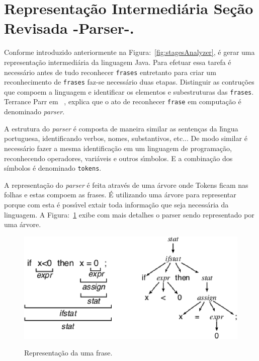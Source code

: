 \section{Representa\c{c}\~{a}o Intermedi\'{a}ria {\color{red}Se\c{c}\~{a}o Revisada -Parser-.}}\label{sec:IR}

Conforme introduzido anteriormente na Figura:~\ref{fig:stagesAnalyzer}, \'{e} gerar uma representa\c{c}\~{a}o intermedi\'{a}ria da linguagem Java. Para efetuar essa tarefa é necessário antes de tudo reconhecer \texttt{frases} entretanto para criar um reconhecimento de \texttt{frases} faz-se necessário duas etapas. Distinguir as contru\c{c}ões que compoem a linguagem e identificar os elementos e subestruturas das \texttt{frases}. Terrance Parr em ~\cite{Parr:2009:LIP:1823613}, explica que o ato de reconhecer \texttt{frase} em computa\c{c}\~{a}o é denominado \textit{parser}.

A estrutura do \textit{parser} \'{e} composta de maneira similar as senten\c{c}as da l\'{\i}ngua portuguesa, identificando verbos, nomes, substantivos, etc... De modo similar \'{e} necess\'{a}rio fazer a mesma identifica\c{c}\~{a}o em um linguagem de programa\c{c}\~{a}o, reconhecendo operadores, vari\'{a}veis e outros s\'{\i}mbolos. E a combina\c{c}\~{a}o dos s\'{i}mbolos \'{e} denominado \texttt{tokens}.

A representa\c{c}\~{a}o do \textit{parser} \'{e} feita atrav\'{e}s de uma árvore onde Tokens ficam nas folhas e estas  compoem as frases. \'{E} utilizando uma \'{a}rvore para representar porque com esta \'{e} poss\'{\i}vel extair toda informa\c{c}\~{a}o que seja necess\'{a}ria da linguagem. A Figura:~\ref{fig:treeParse} exibe com mais detalhes o parser sendo representado por uma \'{a}rvore.

\begin{figure}[h]
	\center
	\includegraphics[scale=0.9]{Imagens/treeParser}
	\label{fig:treeParse}
	\caption{Representa\c{c}\~{a}o da uma frase.}
\end{figure}


